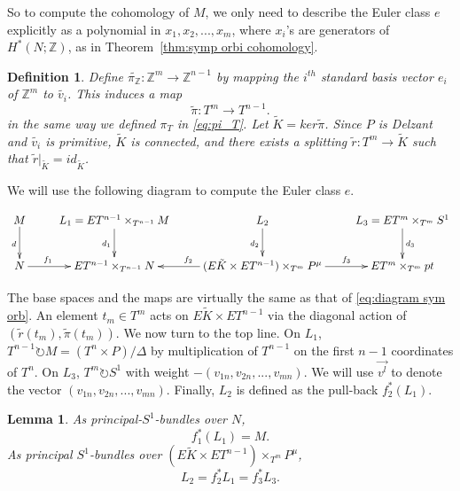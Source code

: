 \documentclass[12pt]{amsart}
\newtheorem{lemma}[theorem]{Lemma}
\newtheorem{definition}[theorem]{Definition}
\theoremstyle{definition}
\numberwithin{equation}{section}
\begin{document}
So to compute the cohomology of $M$, we only need to describe the
Euler class $e$ explicitly as a polynomial in
$x_{1},x_{2},...,x_{m}$, where $x_{i}$'s are generators of
$H^{*}(N;{{\mathbb{Z}}})$, as in
 Theorem~\ref{thm:symp orbi cohomology}.

\begin{definition}
Define $\tilde{\pi_{{\mathbb{Z}}}}: {{\mathbb{Z}}}^m\rightarrow {{\mathbb{Z}}}^{n-1}$ by mapping the
$i^{th}$ standard basis vector $e_{i}$ of ${{\mathbb{Z}}}^m$ to $\tilde{v_{i}}$.
This induces a map
\begin{equation}
\tilde{\pi}: T^m\rightarrow T^{n-1}.
\end{equation}
in the same way we defined $\pi_{T}$ in \eqref{eq:pi_T}. Let
$\tilde{K}=ker \tilde{\pi}$. Since $P$ is Delzant and
$\tilde{v_{i}}$ is primitive, $\tilde{K}$ is connected, and there
exists a splitting $\tilde{r}: T^m\rightarrow \tilde{K}$ such that
$\tilde{r}|_{\tilde{K}}=id_{\tilde{K}}$.
\end{definition}

We will use the following diagram to compute the Euler class $e$.

 {
\[\xymatrix{
  M \ar[d]_{d}  & L_{1}=ET^{n-1}\times_{T^{n-1}}M \ar[d]_{d_{1}}  &
   L_{2} \ar[d]_{d_{2}}  & L_{3}=ET^m\times_{T^m}S^1 \ar[d]^{d_{3}} \\
  N \ar[r]^(.3){f_{1}} & ET^{n-1}\times_{T^{n-1}}N &
  (E\tilde{K}\times ET^{n-1})\times_{T^m}P^{\mu} \ar[l]_{f_{2}}  \ar[r]^(0.6){f_{3}} & ET^{m}\times_{T^m}pt  }\]
}

The base spaces and the maps are virtually the same as that of
\eqref{eq:diagram sym orb}. An element $t_m\in T^m$ acts on
$E\tilde{K}\times ET^{n-1}$ via the diagonal action of
$(\tilde{r}(t_m), \tilde{\pi}(t_m))$. We now turn to the top line.
On $L_{1}$, $T^{n-1}\circlearrowright M= (T^{n}\times P)/\Delta$ by
multiplication of $T^{n-1}$ on the first $n-1$ coordinates of
$T^{n}$.
 On $L_{3}$, $T^{m}\circlearrowright S^{1}$ with weight
$-(v_{1n},v_{2n},...,v_{mn})$. We will use $\vec{v^l}$ to denote the
vector $(v_{1n},v_{2n},...,v_{mn})$. Finally,
 $L_{2}$ is defined as the pull-back $f_{2}^{*}(L_{1})$.

\begin{lemma}\label{lemma:digram Euler}
As principal-$S^{1}$-bundles over $N$,
\begin{equation}\label{eq:f_1}
f_{1}^{*}(L_{1})=M.
\end{equation}
As principal $S^{1}$-bundles over $(E\tilde{K}\times
ET^{n-1})\times_{T^m}P^{\mu}$,
\begin{equation}\label{eq:L_2}
L_{2}=f_{2}^{*}L_{1}= f_{3}^{*}L_{3}.
\end{equation}
\end{lemma}
\end{document}
